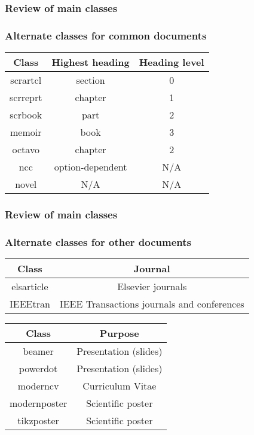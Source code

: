 \documentclass[11pt]{beamer}
\begin{document}
\begin{frame}
	\frametitle{Review of main classes}
	\frametitle{Alternate classes for common documents}
	
	
	\begin{table}[h]
		\begin{tabular}{*{3}{c}}
			\toprule
			 Class   & Highest heading  & Heading level \\ \midrule
			scrartcl &     section      &       0       \\
			scrreprt &     chapter      &       1       \\
			scrbook  &       part       &       2       \\
			 memoir  &       book       &       3       \\
			 octavo  &     chapter      &       2       \\
			  ncc    & option-dependent &      N/A      \\
			 novel   &       N/A        &      N/A      \\ \bottomrule
		\end{tabular}
	\end{table}
\end{frame}


\begin{frame}
	\frametitle{Review of main classes}
	\frametitle{Alternate classes for other documents}
	
	\begin{table}[h]
		\begin{tabular}{*{2}{c}}
			\toprule
			  Class    &                  Journal                   \\ \midrule
			elsarticle &             Elsevier journals              \\
			 IEEEtran  & IEEE Transactions journals and conferences \\ \bottomrule
		\end{tabular}
	\end{table}

	\begin{table}[h]
		\begin{tabular}{*{2}{c}}
			\toprule
			   Class     &        Purpose        \\ \midrule
			   beamer    & Presentation (slides) \\
			  powerdot   & Presentation (slides) \\
			  moderncv   &   Curriculum Vitae    \\
			modernposter &   Scientific poster   \\
			 tikzposter  &   Scientific poster   \\ \bottomrule
		\end{tabular}
	\end{table}
\end{frame}
\end{document}
